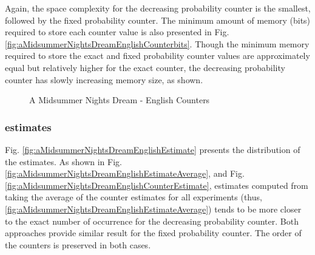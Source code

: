 \documentclass[longpaper, english, final, times]{revdetua}
\begin{document}
				Again, the space complexity for the decreasing probability counter is the smallest, followed by the fixed probability counter. The minimum amount of memory (bits) required to store each counter value is also presented in Fig. \ref{fig:aMidsummerNightsDreamEnglishCounterbits}. Though the minimum memory required to store the exact and fixed probability counter values are approximately equal but relatively higher for the exact counter, the decreasing probability counter has slowly increasing memory size, as shown.
				\begin{figure}[h]
					\caption{A Midsummer Nights Dream - English Counters}
					\begin{center}
					\end{center}
					\label{fig:aMidsummerNightsDreamEnglishCounter}
				\end{figure}
			
			\subsubsection{estimates}
				Fig. \ref{fig:aMidsummerNightsDreamEnglishEstimate} presents the distribution of the estimates. As shown in Fig. \ref{fig:aMidsummerNightsDreamEnglishEstimateAverage}, and Fig. \ref{fig:aMidsummerNightsDreamEnglishCounterEstimate}, estimates computed from taking the average of the counter estimates for all experiments (thus, \ref{fig:aMidsummerNightsDreamEnglishEstimateAverage}) tends to be more closer to the exact number of occurrence for the decreasing probability counter. Both approaches provide similar result for the fixed probability counter. The order of the counters is preserved in both cases.\\
			
\end{document}
